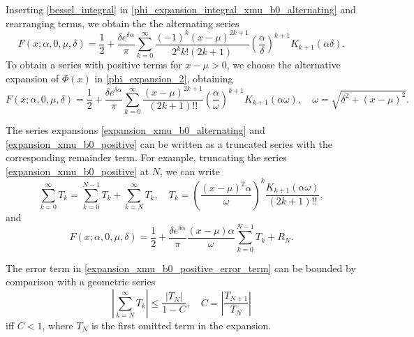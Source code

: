 \documentclass[10pt,a4paper,oneside]{article}
\numberwithin{equation}{section}
\begin{document}
Inserting \eqref{bessel_integral} in \eqref{phi_expansion_integral_xmu_b0_alternating} and rearranging terms, we obtain the the alternating series
\begin{equation}\label{expansion_xmu_b0_alternating}
F(x; \alpha, 0, \mu, \delta) = \frac{1}{2} + \frac{\delta e^{\delta \alpha}}{\pi}\sum_{k=0}^{\infty} \frac{(-1)^k (x-\mu)^{2k+1}}{2^k k! (2k + 1)} \left(\frac{\alpha}{\delta}\right)^{k+1}K_{k+1}(\alpha \delta).
\end{equation}
To obtain a series with positive terms for $x - \mu > 0$, we choose the alternative expansion of $\Phi(x)$ in \eqref{phi_expansion_2}, obtaining
\begin{equation}\label{expansion_xmu_b0_positive}
F(x; \alpha, 0, \mu, \delta) = \frac{1}{2} + \frac{\delta e^{\delta \alpha}} {\pi}\sum_{k=0}^{\infty} \frac{(x-\mu)^{2k+1}}{(2k +1)!!} \left(\frac{\alpha}{\omega}\right)^{k+1}K_{k+1}(\alpha \omega), \quad \omega = \sqrt{\delta^2 + (x-\mu)^2}.
\end{equation}

The series expansions \eqref{expansion_xmu_b0_alternating} and \eqref{expansion_xmu_b0_positive} can be written as a truncated series with the corresponding remainder term. For example, truncating the series \eqref{expansion_xmu_b0_positive} at $N$, we can write
\begin{equation}\label{expansion_xmu_b0_positive_error_term}
\sum_{k=0}^{\infty} T_k = \sum_{k=0}^{N-1} T_k + \sum_{k=N}^{\infty}T_k, \quad T_k = \left(\frac{(x-\mu)^2 \alpha}{\omega}\right)^k \frac{K_{k+1}(\alpha \omega)}{(2k +1)!!},
\end{equation}
and
\begin{equation*}
F(x; \alpha, 0, \mu, \delta) = \frac{1}{2} + \frac{\delta e^{\delta \alpha}}{\pi}\frac{(x-\mu)\alpha}{\omega}\sum_{k=0}^{N-1}T_k + R_N.
\end{equation*}

The error term in \eqref{expansion_xmu_b0_positive_error_term} can be bounded by comparison with a geometric series
\begin{equation}
\left|\sum_{k=N}^{\infty} T_k \right| \le \frac{|T_N|}{1 - C}, \quad C = \left|\frac{T_{N+1}}{T_N}\right|
\end{equation}
iff $C < 1$, where $T_N$ is the first omitted term in the expansion.
\end{document}
